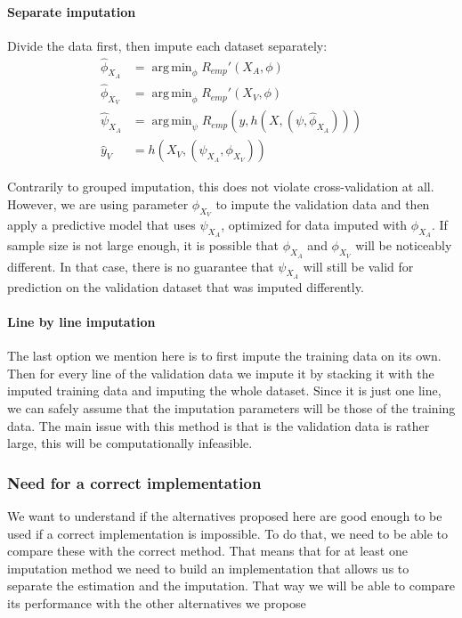 \documentclass[12pt, a4paper]{memoir}
\DeclareMathOperator*{\argmin}{arg\,min}
\begin{document}
\paragraph{Separate imputation}
Divide the data first, then impute each dataset separately:
\begin{align*}
\hat{\phi}_{X_A} &= \argmin_{\phi} R_{emp}'(X_A, \phi) \\
\hat{\phi}_{X_V} &= \argmin_{\phi} R_{emp}'(X_V, \phi) \\
\hat{\psi}_{X_A} &= \argmin_{\psi} R_{emp}(y, h(X, (\psi, \hat{\phi}_{X_A}))) \\
\hat{y}_V &= h(X_V, (\psi_{X_A}, \phi_{X_V}))
\end{align*}

Contrarily to grouped imputation, this does not violate cross-validation at all. However, we are using parameter $\phi_{X_V}$ to impute the validation data and then apply a predictive model that uses $\psi_{X_A}$, optimized for data imputed with $\phi_{X_A}$. If sample size is not large enough, it is possible that $\phi_{X_A}$ and $\phi_{X_V}$ will be noticeably different. In that case, there is no guarantee that $\psi_{X_A}$ will still be valid for prediction on the validation dataset that was imputed differently. 

\paragraph{Line by line imputation}
The last option we mention here is to first impute the training data on its own. Then for every line of the validation data we impute it by stacking it with the imputed training data and imputing the whole dataset. Since it is just one line, we can safely assume that the imputation parameters will be those of the training data. The main issue with this method is that is the validation data is rather large, this will be computationally infeasible.

			\subsubsection{Need for a correct implementation}
We want to understand if the alternatives proposed here are good enough to be used if a correct implementation is impossible. To do that, we need to be able to compare these with the correct method. That means that for at least one imputation method we need to build an implementation that allows us to separate the estimation and the imputation. That way we will be able to compare its performance with the other alternatives we propose
\end{document}
